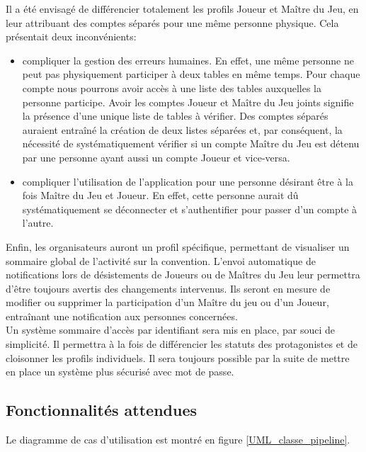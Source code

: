 \documentclass[11pt]{article}
\begin{document}
\indent Il a été envisagé de différencier totalement les profils Joueur et Maître du Jeu, en leur attribuant des comptes séparés pour une même personne physique. Cela présentait deux inconvénients:
\begin{itemize}
\item{compliquer la gestion des erreurs humaines. En effet, une même personne ne peut pas physiquement participer à deux tables en même temps. Pour chaque compte nous pourrons avoir accès à une liste des tables auxquelles la personne participe. Avoir les comptes Joueur et Maître du Jeu joints signifie la présence d'une unique liste de tables à vérifier. Des comptes séparés auraient entraîné la création de deux listes séparées et, par conséquent, la nécessité de systématiquement vérifier si un compte Maître du Jeu est détenu par une personne ayant aussi un compte Joueur et vice-versa.}
\item{compliquer l'utilisation de l'application pour une personne désirant être à la fois Maître du Jeu et Joueur. En effet, cette personne aurait dû systématiquement se déconnecter et s'authentifier pour passer d'un compte à l'autre.\\}
\end{itemize}

Enfin, les organisateurs auront un profil spécifique, permettant de visualiser un sommaire global de l'activité sur la convention. L'envoi automatique de notifications lors de désistements de Joueurs ou de Maîtres du Jeu leur permettra d'être toujours avertis des changements intervenus. Ils seront en mesure de modifier ou supprimer la participation d'un Maître du jeu ou d'un Joueur, entraînant une notification aux personnes concernées.\\

Un système sommaire d'accès par identifiant sera mis en place, par souci de simplicité. Il permettra à la fois de différencier les statuts des protagonistes et de cloisonner les profils individuels. Il sera toujours possible par la suite de mettre en place un système plus sécurisé avec mot de passe. \\



\subsection{Fonctionnalités attendues}

Le diagramme de cas d'utilisation est montré en figure \ref{UML_classe_pipeline}. \\
\end{document}
